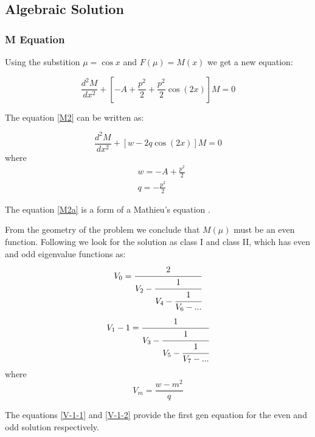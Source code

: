\subsection{Algebraic Solution}

\subsubsection{ M Equation }

Using the substition $ \mu  = \cos x$ and $ F(\mu) = M(x) $ we get a new equation:

\begin{equation}\label{M2}
\frac{d^2 M}{d x^2} + \left[-A + \frac{p^2}{2} + \frac{p^2}{2}\cos(2x) \right]M = 0 
\end{equation}

The equation \eqref{M2} can be written as:

\begin{equation}\label{M2a}
\frac{d^2 M}{d x^2} + \left[w - 2q\cos(2x)\right]M = 0
\end{equation}
where
\begin{equation}
\begin{split}
& w = - A + \frac{p^2}{2} \\[.7em]
& q = - \frac{p^2}{2}
\end{split}
\end{equation}

The equation \eqref{M2a} is a form of a  Mathieu's equation \cite{Mathieu2}. 

From the geometry of the problem we conclude that $ M(\mu) $ must be an even function.  Following \cite{Mathieu4} we look for the solution as class I and class II, which has even and odd eigenvalue functions as:
\begin{equation}
\begin{split}
V_0 = \cfrac{2}{V_2 - \cfrac{1}{V_4 - \cfrac{1}{V_6 - ...}}}\label{V-1-1}
\end{split}
\end{equation}
\begin{equation}
\begin{split}
V_1 - 1 = \cfrac{1}{V_3 - \cfrac{1}{V_5 - \cfrac{1}{V_7 - ...}}}\label{V-1-2}
\end{split}
\end{equation}
where 
\begin{equation}
V_m = \frac{w - m^2}{q}
\end{equation}

The equations \ref{V-1-1} and \ref{V-1-2} provide the first gen equation for the even and odd solution respectively.

